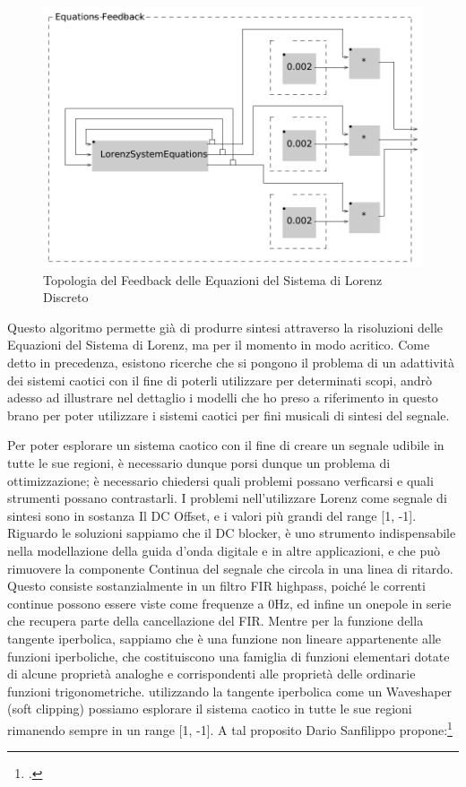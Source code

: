 \begin{figure}[h!]
\begin{center}
    \includegraphics[width=14cm]{figures/LorenzSystemFB1.pdf}
    \caption{Topologia del Feedback delle Equazioni del Sistema di Lorenz Discreto}
\end{center}
\vspace{0.5cm}
\end{figure}

Questo algoritmo permette già di produrre sintesi attraverso la 
risoluzioni delle Equazioni del Sistema di Lorenz, ma per il momento in modo acritico.
Come detto in precedenza, esistono ricerche che si pongono il problema 
di un adattività dei sistemi caotici con il fine di poterli utilizzare per determinati scopi,
andrò adesso ad illustrare nel dettaglio i modelli che ho preso 
a riferimento in questo brano per poter utilizzare
i sistemi caotici per fini musicali di sintesi del segnale. 

Per poter esplorare un sistema caotico con il fine di creare un segnale udibile in tutte le sue regioni, 
è necessario dunque porsi dunque un problema di ottimizzazione;
è necessario chiedersi quali problemi possano verficarsi e quali strumenti possano contrastarli. 
I problemi nell'utilizzare Lorenz come segnale di sintesi 
sono in sostanza Il DC Offset, e i valori più grandi del range [1, -1].
Riguardo le soluzioni sappiamo che il DC blocker, 
è uno strumento indispensabile nella modellazione della guida d’onda
digitale e in altre applicazioni, e che può rimuovere la componente Continua del segnale 
che circola in una linea di ritardo. Questo consiste sostanzialmente in
un filtro FIR highpass, poiché le correnti continue possono essere viste come frequenze a
0Hz, ed infine un onepole in serie che recupera parte della cancellazione del FIR.
Mentre per la funzione della tangente iperbolica, sappiamo che è una funzione
non lineare appartenente alle funzioni iperboliche, che costituiscono una famiglia di funzioni 
elementari dotate di alcune proprietà analoghe e corrispondenti alle
proprietà delle ordinarie funzioni trigonometriche.
utilizzando la tangente iperbolica come un Waveshaper (soft clipping) possiamo 
esplorare il sistema caotico in tutte le sue regioni rimanendo sempre in un range [1, -1].
A tal proposito Dario Sanfilippo propone:\footcite{sanfilippo_constrained_2021}


